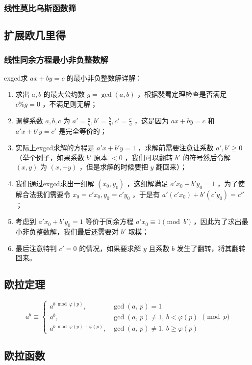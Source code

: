 \documentclass{article}
\begin{document}
\subsubsection{线性莫比乌斯函数筛}

\subsection{扩展欧几里得}
\subsubsection{线性同余方程最小非负整数解}
exgcd求 $ax+by=c$ 的最小非负整数解详解：
\begin{enumerate}
    \item 求出 $a,b$ 的最大公约数 $g=\gcd(a,b)$ ，根据裴蜀定理检查是否满足 $c\% g=0$ ，不满足则无解；
    \item 调整系数 $a,b,c$ 为 $a'=\frac{a}{g},b'=\frac{b}{g},c'=\frac{c}{g}$ ，这是因为 $ax+by=c$ 和 $a'x+b'y=c'$ 是完全等价的；
    \item 实际上exgcd求解的方程是 $a'x+b'y=1$ ，求解前需要注意让系数 $a',b'\geq 0$ （举个例子，如果系数 $b'$ 原本 $<0$ ，我们可以翻转 $b'$ 的符号然后令解 $(x,y)$ 为 $(x,-y)$ ，但是求解的时候要把 $y$ 翻回来）；
    \item 我们通过exgcd求出一组解 $(x_0,y_0)$ ，这组解满足 $a'x_0+b'y_0=1$ ，为了使解合法我们需要令 $x_0=c'x_0,y_0=c'y_0$ ，于是有 $a'(c'x_0)+b'(c'y_0)=c''$ ；
    \item 考虑到 $a'x_0+b'y_0=1$ 等价于同余方程 $a'x_0\equiv 1\pmod{b'}$ ，因此为了求出最小非负整数解，我们最后还需要对 $b'$ 取模；
    \item 最后注意特判 $c'=0$ 的情况，如果要求解 $y$ 且系数 $b$ 发生了翻转，将其翻转回来。
\end{enumerate}


\subsection{欧拉定理}

$$
a^b\equiv
\begin{cases}
a^{b\bmod\varphi(p)},\,&\gcd(a,\,p)=1\\
a^b,&\gcd(a,\,p)\ne1,\,b<\varphi(p)\\
a^{b\bmod\varphi(p)+\varphi(p)},&\gcd(a,\,p)\ne1,\,b\ge\varphi(p)
\end{cases}
\pmod p
$$

\subsection{欧拉函数}
\end{document}
